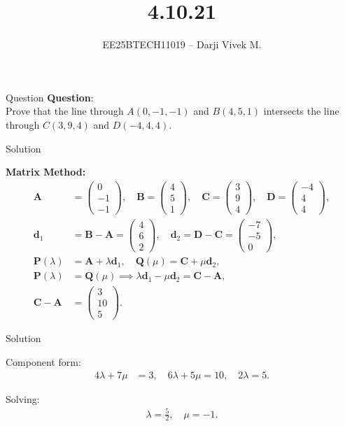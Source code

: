 \documentclass{beamer}
\title{4.10.21}
\author{EE25BTECH11019 -- Darji Vivek M.}
\date{}
\newcommand{\myvec}[1]{\begin{pmatrix}#1\end{pmatrix}}
\renewcommand{\vec}[1]{\mathbf{#1}}
\begin{document}
\begin{frame}
\titlepage
\end{frame}

\begin{frame}{Question}
\textbf{Question}:\\
Prove that the line through $A(0,-1,-1)$ and $B(4,5,1)$ intersects the line through $C(3,9,4)$ and $D(-4,4,4)$.\\[4pt]
\end{frame}

\begin{frame}{Solution}

\textbf{Matrix Method:}\\
\begin{align}
\vec{A}&=\myvec{0\\-1\\-1},\quad
\vec{B}=\myvec{4\\5\\1},\quad
\vec{C}=\myvec{3\\9\\4},\quad
\vec{D}=\myvec{-4\\4\\4},\\
\vec{d}_1&=\vec{B}-\vec{A}=\myvec{4\\6\\2},\quad
\vec{d}_2=\vec{D}-\vec{C}=\myvec{-7\\-5\\0},\\
\vec{P}(\lambda)&=\vec{A}+\lambda\vec{d}_1,\quad
\vec{Q}(\mu)=\vec{C}+\mu\vec{d}_2,\\
\vec{P}(\lambda)&=\vec{Q}(\mu)\implies 
\lambda\vec{d}_1-\mu\vec{d}_2=\vec{C}-\vec{A},\\
\vec{C}-\vec{A}&=\myvec{3\\10\\5}.
\end{align}
\end{frame}

\begin{frame}{Solution}

Component form:
\begin{align}
4\lambda+7\mu&=3, \quad
6\lambda+5\mu=10, \quad
2\lambda=5.
\end{align}

Solving:
\begin{align}
\lambda=\tfrac{5}{2},\quad \mu=-1.
\end{align}
\end{frame}
\end{document}
